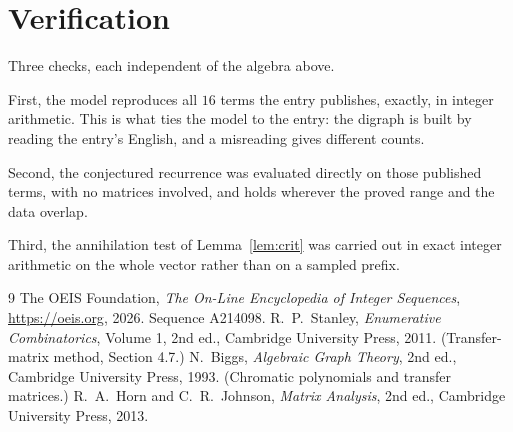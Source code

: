 \documentclass[11pt,a4paper]{article}
\theoremstyle{plain}
\theoremstyle{definition}
\begin{document}
\section{Verification}

Three checks, each independent of the algebra above.

First, the model reproduces all $16$ terms the entry publishes, exactly, in integer
arithmetic. This is what ties the model to the entry: the digraph is built by reading the
entry's English, and a misreading gives different counts.

Second, the conjectured recurrence was evaluated directly on those published terms, with no
matrices involved, and holds wherever the proved range and the data overlap.

Third, the annihilation test of Lemma~\ref{lem:crit} was carried out in exact integer
arithmetic on the whole vector rather than on a sampled prefix.

\begin{thebibliography}{9}
 The OEIS Foundation, \emph{The On-Line Encyclopedia of Integer
Sequences}, \url{https://oeis.org}, 2026. Sequence A214098.
 R.~P.~Stanley, \emph{Enumerative Combinatorics}, Volume 1, 2nd ed.,
Cambridge University Press, 2011. (Transfer-matrix method, Section 4.7.)
 N.~Biggs, \emph{Algebraic Graph Theory}, 2nd ed., Cambridge University
Press, 1993. (Chromatic polynomials and transfer matrices.)
 R.~A.~Horn and C.~R.~Johnson, \emph{Matrix Analysis}, 2nd ed., Cambridge
University Press, 2013.
\end{thebibliography}
\end{document}
